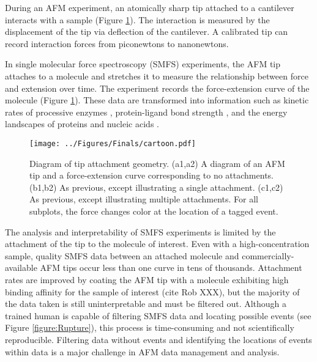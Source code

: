 \documentclass[%
  aip,12pt,tightenlines,
  amsthm,
 amsmath,amssymb
]{article}
\newcommand{\fRef}[1]{Figure \ref{figure:#1}}
\newcommand{\fLabel}[1]{\label{figure:#1}}
\newcommand{\pl}[0]{\vspace{6pt}}
\newcommand{\pEndF}[0]{ \\ }
\newcommand{\pStartF}[0]{ }
\newcommand{\figwidth}[0]{\linewidth}
\newcommand{\singlemol}[0]{SMFS}
\newcommand{\citePRH}[1]{\cite{#1}}
\begin{document}
During an AFM experiment, an atomically sharp tip attached to a cantilever interacts with a sample (\fRef{Cartoon}). The interaction is measured by the displacement of the tip via deflection of the cantilever. A calibrated tip can record interaction forces from piconewtons to nanonewtons. \pl

In single molecular force spectroscopy (\singlemol{}) experiments, the AFM tip attaches to a molecule and stretches it to measure the relationship between force and extension over time. The experiment records the force-extension curve of the molecule (\fRef{Cartoon}). These data are transformed into information such as kinetic rates of processive enzymes \citePRH{comstock_direct_2015}, protein-ligand bond strength \citePRH{yuan_energy_2000}, and the energy landscapes of proteins and nucleic acids \citePRH{dudko_Theory_2008}. \pl

\begin{figure}
\centering
\texttt{[image: ../Figures/Finals/cartoon.pdf]}%
\caption[Diagram of AFM attachment geometry]{\fLabel{Cartoon}\pStartF Diagram of tip attachment geometry. (a1,a2) A diagram of an AFM tip and a force-extension curve corresponding to no attachments. (b1,b2) As previous, except illustrating a single attachment. (c1,c2) As previous, except illustrating multiple attachments. For all subplots, the force changes color at the location of a tagged event.  \pEndF }
\end{figure}


The analysis and interpretability of \singlemol{} experiments is limited by the attachment of the tip to the molecule of interest. Even with a high-concentration sample, quality \singlemol{} data between an attached molecule and commercially-available AFM tips occur less than one curve in tens of thousands\cite{bosshart_reference-free_2012}. Attachment rates are improved by coating the AFM tip with a molecule exhibiting high binding affinity for the sample of interest (cite Rob XXX), but the majority of the data taken is still uninterpretable and must be filtered out. Although a trained human is capable of filtering \singlemol{} data and locating possible events (see \fRef{Rupture}), this process is time-consuming and not scientifically reproducible. Filtering data without events and identifying the locations of events within data is a major challenge in AFM data management and analysis.\pl
\end{document}
